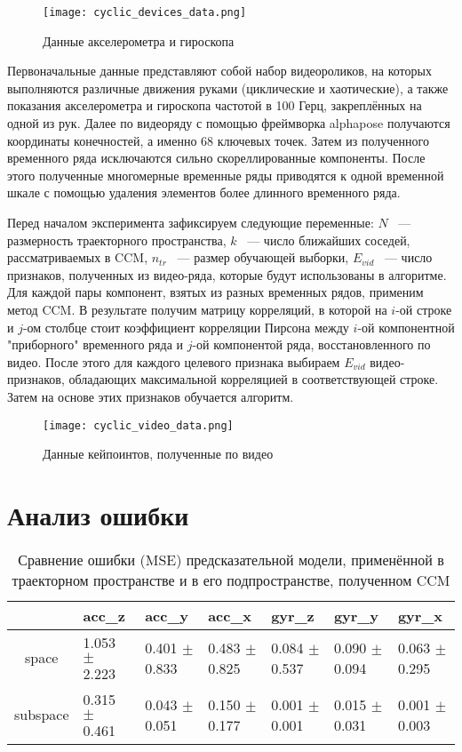 \documentclass[a4paper, 12pt]{article}
\begin{document}
\begin{figure}[bhtp]
	\texttt{[image: cyclic\_devices\_data.png]}
	\caption{Данные акселерометра и гироскопа}
	\label{fig:devices_data}
\end{figure}
Первоначальные данные представляют собой набор видеороликов, на которых выполняются различные движения руками (циклические и хаотические), а также показания акселерометра и гироскопа частотой в 100 Герц, закреплённых на одной из рук. 
Далее по видеоряду с помощью фреймворка alphapose \citep{alphapose_fang2017rmpe, alphapose_li2018crowdpose, alphapose_xiu2018poseflow} получаются координаты конечностей, а именно 68 ключевых точек. 
Затем из полученного временного ряда исключаются сильно скореллированные компоненты.
После этого полученные многомерные временные ряды приводятся к одной временной шкале с помощью удаления элементов более длинного временного ряда.

Перед началом эксперимента зафиксируем следующие переменные: $N$ ~--- размерность траекторного пространства, $k$ ~--- число ближайших соседей, рассматриваемых в CCM, $n_{tr}$ ~--- размер обучающей выборки, $E_{vid}$ ~--- число признаков, полученных из видео-ряда, которые будут использованы в алгоритме.
Для каждой пары компонент, взятых из разных временных рядов, применим метод CCM.
В результате получим матрицу корреляций, в которой на $i\text{-ой}$ строке и $j\text{-ом}$ столбце стоит коэффициент корреляции Пирсона между $i\text{-ой}$ компонентной "приборного" временного ряда и $j\text{-ой}$ компонентой ряда, восстановленного по видео. 
После этого для каждого целевого признака выбираем $E_{vid}$ видео-признаков, обладающих максимальной корреляцией в соответствующей строке.
Затем на основе этих признаков обучается алгоритм.

\begin{figure}[bhtp]
	\texttt{[image: cyclic\_video\_data.png]}
	\caption{Данные кейпоинтов, полученные по видео}
	\label{fig:video_data}
\end{figure}

\section{Анализ ошибки}
\begin{table}[bhtp]
	\fontsize{10pt}{14pt}
	\selectfont
	\centering
	\caption{Сравнение ошибки (MSE) предсказательной модели, применённой в траекторном пространстве и в его подпространстве, полученном CCM}
	\label{tbl:space_and_subspace}
	\begin{tabularx}{\textwidth}{c|XXXXXX}
		\hline
		& acc\_z & acc\_y & acc\_x & gyr\_z & gyr\_y & gyr\_x \\
		\hline
		space & 1.053 $\pm$ 2.223 & 0.401 $\pm$ 0.833 & 0.483 $\pm$ 0.825 & 0.084 $\pm$ 0.537 & 0.090 $\pm$ 0.094 & 0.063 $\pm$ 0.295 \\
		subspace & 0.315 $\pm$ 0.461 & 0.043 $\pm$ 0.051 & 0.150 $\pm$ 0.177 & 0.001 $\pm$ 0.001	& 0.015 $\pm$ 0.031 & 0.001 $\pm$ 0.003 \\
		\hline
	\end{tabularx}
\end{table}
\end{document}
